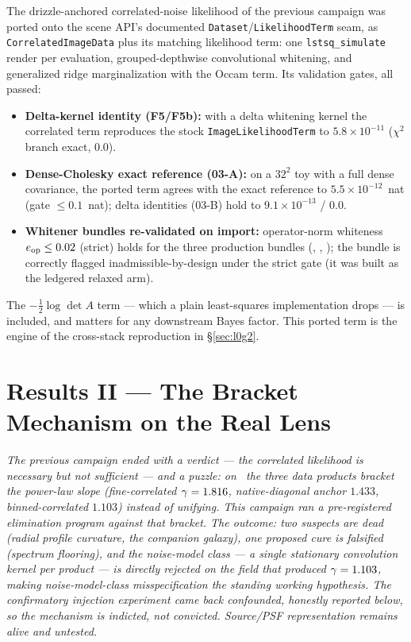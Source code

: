 The drizzle-anchored correlated-noise likelihood of the previous campaign was
ported onto the scene API's documented \texttt{Dataset}/\texttt{LikelihoodTerm}
seam, as \texttt{CorrelatedImageData} plus its matching likelihood term:
one \texttt{lstsq\_simulate} render per evaluation, grouped-depthwise
convolutional whitening, and generalized ridge marginalization with the
Occam term. Its validation gates, all
passed:

\begin{itemize}
\item \textbf{Delta-kernel identity (F5/F5b):} with a delta whitening kernel
the correlated term reproduces the stock \texttt{ImageLikelihoodTerm} to
$5.8\times10^{-11}$ ($\chi^2$ branch exact, $0.0$).
\item \textbf{Dense-Cholesky exact reference (03-A):} on a $32^2$ toy with a
full dense covariance, the ported term agrees with the exact reference to
$5.5\times10^{-12}$~nat (gate $\le0.1$~nat); delta identities (03-B) hold to
$9.1\times10^{-13}$ / $0.0$.
\item \textbf{Whitener bundles re-validated on import:} operator-norm
whiteness $e_{\mathrm{op}}\le0.02$ (strict) holds for the three production bundles
(, , );
the  bundle is correctly flagged
inadmissible-by-design under the strict gate (it was built as the ledgered
relaxed arm).
\end{itemize}

The $-\tfrac12\log\det A$ term --- which a plain least-squares implementation
drops --- is included, and matters for any downstream Bayes factor. This
ported term is the engine of the cross-stack reproduction in
\S\ref{sec:l0g2}.

\section{Results II --- The Bracket Mechanism on the Real Lens}
\label{sec:mech}

\noindent\emph{The previous campaign ended with a verdict --- the correlated
likelihood is necessary but not sufficient --- and a puzzle: on \foundry\ the
three data products bracket the power-law slope
(fine-correlated $\gamma=1.816$, native-diagonal anchor $1.433$,
binned-correlated $1.103$) instead of unifying. This campaign ran a
pre-registered elimination program against that bracket. The outcome: two
suspects are dead (radial profile curvature, the companion galaxy), one
proposed cure is falsified (spectrum flooring), and the noise-model
\emph{class} --- a single stationary convolution kernel per product --- is
directly rejected on the field that produced $\gamma=1.103$, making
noise-model-class misspecification the standing working hypothesis. The
confirmatory injection experiment came back confounded, honestly reported
below, so the mechanism is indicted, not convicted. Source/PSF
representation remains alive and untested.}

